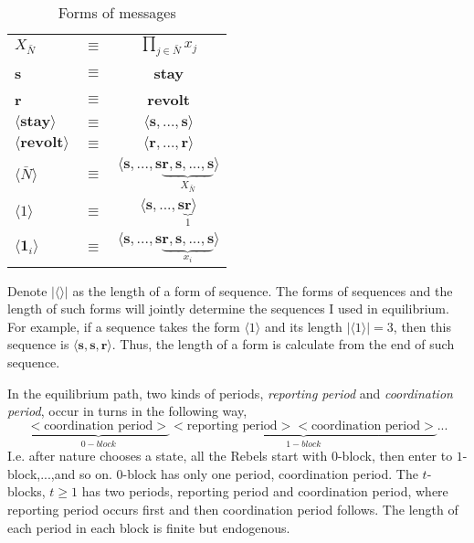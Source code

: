 \documentclass[12pt,letter]{article}
\theoremstyle{definition}
\theoremstyle{remark}
\theoremstyle{claim}
\begin{document}
\begin{table}[t]
\caption{Forms of messages}
\label{Table_msg_form}
\begin{center}
\begin{tabular}{l c c}
$X_{\bar{N}}$ 								& $\equiv$ 			& $\prod_{j\in \bar{N}}x_j$  \\
\textbf{s}										& $\equiv$ 			& \textbf{stay}  \\
\textbf{r}										& $\equiv$ 			& \textbf{revolt}  \\
$\langle \textbf{stay} \rangle$ 		& $\equiv$ 			& $\langle \textbf{s},...,\textbf{s}\rangle$  \\
$\langle \textbf{revolt} \rangle$ 	& $\equiv$ 			& $\langle \textbf{r},...,\textbf{r}\rangle$  \\
$\langle  \bar{N} \rangle$ 				& $\equiv$ 			& $\langle \textbf{s},...,\textbf{s}\underbrace{\textbf{r},\textbf{s},...,\textbf{s}}_{X_{ \bar{N}}}\rangle$  \\

$\langle 1 \rangle$	 					& $\equiv$ 			& $\langle \textbf{s},...,\textbf{s}\underbrace{\textbf{r}}_{1}\rangle$  \\
$\langle \mathbf{1}_i \rangle$	 	& $\equiv$ 			& $\langle \textbf{s},...,\textbf{s}\underbrace{\textbf{r},\textbf{s},...,\textbf{s}}_{x_i}\rangle$  \\
\end{tabular}
\end{center}
\end{table}

Denote $|\langle\rangle|$ as the length of a form of sequence. The forms of sequences and the length of such forms will jointly determine the sequences I used in equilibrium. For example, if a sequence takes the form $\langle 1 \rangle$ and its length $|\langle 1 \rangle|=3$, then this sequence is $\langle \textbf{s},\textbf{s},\textbf{r}\rangle$. Thus, the length of a form is calculate from the end of such sequence.

In the equilibrium path, two kinds of periods, \textit{reporting period} and \textit{coordination period}, occur in turns in the following way,
\[\underbrace{<\text{coordination period}>}_{0-block}\underbrace{<\text{reporting period}><\text{coordination period}>}_{1-block}...\]
I.e. after nature chooses a state, all the Rebels start with $0$-block, then enter to $1$-block,...,and so on. $0$-block has only one period, coordination period. The $t$-blocks, $t\geq 1$ has two periods, reporting period and coordination period, where reporting period occurs first and then coordination period follows. The length of each period in each block is finite but endogenous.
\end{document}
